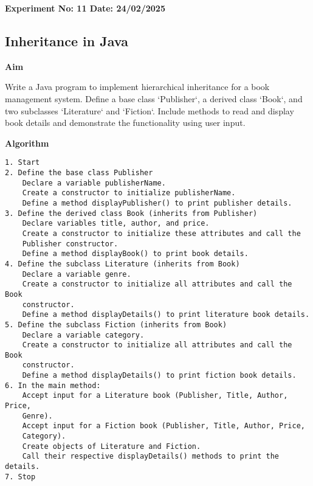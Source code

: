 \textbf{Experiment No: 11 \hfill Date: 24/02/2025}

\begin{center}
    \Large \subsection*{Inheritance in Java}
\end{center}

\textbf{Aim}
\vspace{0.5cm}

Write a Java program to implement hierarchical inheritance for a book management system. Define a base class ‘Publisher‘, a derived class ‘Book‘, and two subclasses ‘Literature‘ and ‘Fiction‘. Include methods to read and display book details and demonstrate the functionality using user input.

\vspace{0.5cm}
\textbf{Algorithm}
\vspace{0.5cm}
\begin{verbatim}
1. Start
2. Define the base class Publisher
    Declare a variable publisherName.
    Create a constructor to initialize publisherName.
    Define a method displayPublisher() to print publisher details.
3. Define the derived class Book (inherits from Publisher)
    Declare variables title, author, and price.
    Create a constructor to initialize these attributes and call the 
    Publisher constructor.
    Define a method displayBook() to print book details.
4. Define the subclass Literature (inherits from Book)
    Declare a variable genre.
    Create a constructor to initialize all attributes and call the Book 
    constructor.
    Define a method displayDetails() to print literature book details.
5. Define the subclass Fiction (inherits from Book)
    Declare a variable category.
    Create a constructor to initialize all attributes and call the Book 
    constructor.
    Define a method displayDetails() to print fiction book details.
6. In the main method:
    Accept input for a Literature book (Publisher, Title, Author, Price, 
    Genre).
    Accept input for a Fiction book (Publisher, Title, Author, Price, 
    Category).
    Create objects of Literature and Fiction.
    Call their respective displayDetails() methods to print the details.
7. Stop
\end{verbatim}

